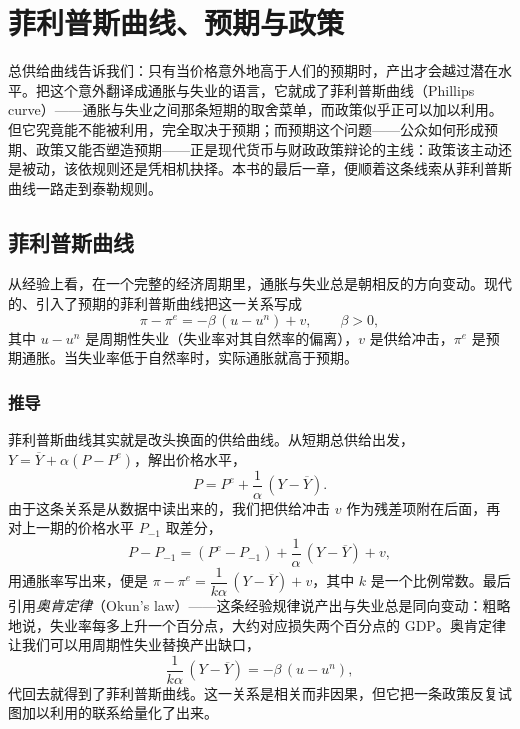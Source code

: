 \chapter{菲利普斯曲线、预期与政策}
\label{ch:phillips}

总供给曲线告诉我们：只有当价格意外地高于人们的预期时，产出才会越过潜在水平。把这个意外翻译成通胀与失业的语言，它就成了菲利普斯曲线（Phillips curve）——通胀与失业之间那条短期的取舍菜单，而政策似乎正可以加以利用。但它究竟能不能被利用，完全取决于预期；而预期这个问题——公众如何形成预期、政策又能否塑造预期——正是现代货币与财政政策辩论的主线：政策该主动还是被动，该依规则还是凭相机抉择。本书的最后一章，便顺着这条线索从菲利普斯曲线一路走到泰勒规则。

\section{菲利普斯曲线}

从经验上看，在一个完整的经济周期里，通胀与失业总是朝相反的方向变动。现代的、引入了预期的菲利普斯曲线把这一关系写成
\[
\pi - \pi^{e} = -\beta\,(u - u^{n}) + v, \qquad \beta>0,
\]
其中 $u-u^{n}$ 是周期性失业（失业率对其自然率的偏离），$v$ 是供给冲击，$\pi^{e}$ 是预期通胀。当失业率低于自然率时，实际通胀就高于预期。


\subsection{推导}

菲利普斯曲线其实就是改头换面的供给曲线。从短期总供给出发，$Y=\overline{Y}+\alpha(P-P^{e})$，解出价格水平，
\[
P = P^{e} + \frac{1}{\alpha}\,(Y-\overline{Y}).
\]
由于这条关系是从数据中读出来的，我们把供给冲击 $v$ 作为残差项附在后面，再对上一期的价格水平 $P_{-1}$ 取差分，
\[
P - P_{-1} = (P^{e}-P_{-1}) + \frac{1}{\alpha}\,(Y-\overline{Y}) + v,
\]
用通胀率写出来，便是 $\pi - \pi^{e} = \dfrac{1}{k\alpha}\,(Y-\overline{Y}) + v$，其中 $k$ 是一个比例常数。最后引用\emph{奥肯定律}（Okun's law）——这条经验规律说产出与失业总是同向变动：粗略地说，失业率每多上升一个百分点，大约对应损失两个百分点的 GDP。奥肯定律让我们可以用周期性失业替换产出缺口，
\[
\frac{1}{k\alpha}\,(Y-\overline{Y}) = -\beta\,(u-u^{n}),
\]
代回去就得到了菲利普斯曲线。这一关系是相关而非因果，但它把一条政策反复试图加以利用的联系给量化了出来。

